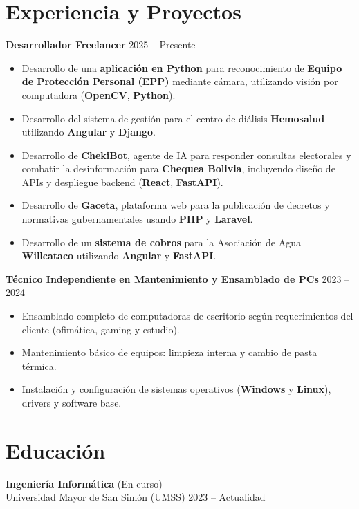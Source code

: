 \documentclass[11pt,a4paper]{article}
\begin{document}
	\section*{Experiencia y Proyectos}
	\textbf{Desarrollador Freelancer} \hfill 2025 -- Presente
	\begin{itemize}[leftmargin=*]
		\item Desarrollo de una \textbf{aplicación en Python} para reconocimiento de \textbf{Equipo de Protección Personal (EPP)} mediante cámara, utilizando visión por computadora (\textbf{OpenCV}, \textbf{Python}).
		\item Desarrollo del sistema de gestión para el centro de diálisis \textbf{Hemosalud} utilizando \textbf{Angular} y \textbf{Django}.
		\item Desarrollo de \textbf{ChekiBot}, agente de IA para responder consultas electorales y combatir la desinformación para \textbf{Chequea Bolivia}, incluyendo diseño de APIs y despliegue backend (\textbf{React}, \textbf{FastAPI}).
		\item Desarrollo de \textbf{Gaceta}, plataforma web para la publicación de decretos y normativas gubernamentales usando \textbf{PHP} y \textbf{Laravel}.
		\item Desarrollo de un \textbf{sistema de cobros} para la Asociación de Agua \textbf{Willcataco} utilizando \textbf{Angular} y \textbf{FastAPI}.
	\end{itemize}

	\textbf{Técnico Independiente en Mantenimiento y Ensamblado de PCs} \hfill 2023 -- 2024
	\begin{itemize}[leftmargin=*]
		\item Ensamblado completo de computadoras de escritorio según requerimientos del cliente (ofimática, gaming y estudio).
		\item Mantenimiento básico de equipos: limpieza interna y cambio de pasta térmica.
		\item Instalación y configuración de sistemas operativos (\textbf{Windows} y \textbf{Linux}), drivers y software base.
	\end{itemize}
	
	\section*{Educación}
	\textbf{Ingeniería Informática} (En curso) \\
	Universidad Mayor de San Simón (UMSS) \hfill 2023 -- Actualidad
	
\end{document}
